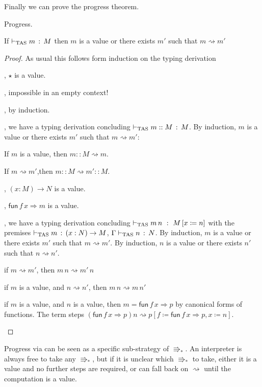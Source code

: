 Finally we can prove the progress theorem.
\begin{thm} Progress.
 
If $\vdash_{\mathrm{TAS}} m\,:\,M$ then $m$ is a value or there exists $m'$ such that $m\rightsquigarrow m'$
\end{thm}
\begin{proof}
As usual this follows form induction on the typing derivation
 
\begin{casenv}
 \item {}, $\star$ is a value.
 \item {}, impossible in an empty context!
 \item {}, by induction.
 \item {}, we have a typing derivation concluding $\vdash_{\mathrm{TAS}} m::M\,:\,M$.
 By induction, $m$ is a value or there exists $m'$ such that $m\rightsquigarrow m'$:
 \begin{casenv}
   \item If $m$ is a value, then $m::M\rightsquigarrow m$.
   \item If $m\rightsquigarrow m'$,then $m::M\rightsquigarrow m'::M$.
 \end{casenv}
 \item {}, $\left(x:M\right)\rightarrow N$ is a value.
 \item {}, $\mathsf{fun}\,f\,x\Rightarrow m$ is a value.
 \item {}, we have a typing derivation concluding $\vdash_{\mathrm{TAS}} m\,n\ :\ M\left[x\coloneqq n\right]$ with the premises $\vdash_{\mathrm{TAS}} m\,:\,\left(x:N\right)\rightarrow M$, $\Gamma\vdash_{\mathrm{TAS}} n\,:\,N$.
 By induction, $m$ is a value or there exists $m'$ such that $m\rightsquigarrow m'$.
 By induction, $n$ is a value or there exists $n'$ such that $n\rightsquigarrow n'$.
 \begin{casenv}
   \item if $m\rightsquigarrow m'$, then $m\,n\rightsquigarrow m'\,n$
   \item if $m$ is a value, and $n\rightsquigarrow n'$,  then $m\,n\rightsquigarrow m\,n'$
   \item if $m$ is a value, and $n$ is a value, then $m=\mathsf{fun}\,f\,x\Rightarrow p$ by canonical forms of functions.
     The term steps $\left(\mathsf{fun}\,f\,x\Rightarrow p\right)n\rightsquigarrow p\left[f\coloneqq\mathsf{fun}\,f\,x\Rightarrow p,x\coloneqq n\right]$.
 \end{casenv}
\end{casenv}
 
\end{proof}
Progress via \cbv{} can be seen as a specific sub-strategy of $\Rrightarrow_*$.
An interpreter is always free to take any $\Rrightarrow_*$, but if it is unclear which $\Rrightarrow_*$ to take, either it is a value and no further steps are required, or can fall back on $\rightsquigarrow$ until the computation is a value.

